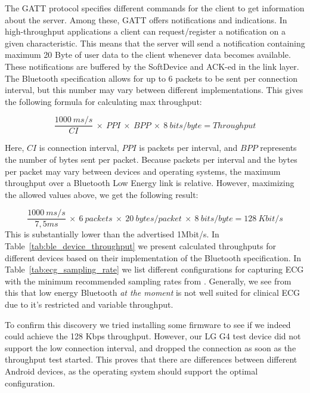 The GATT protocol specifies different commands for the client to get information about the server. Among these, GATT offers notifications and indications. In high-throughput applications a client can request/register a notification on a given characteristic. This means that the server will send a notification containing maximum 20 Byte of user data to the client whenever data becomes available. These notifications are buffered by the SoftDevice and ACK-ed in the link layer. The Bluetooth specification allows for up to 6 packets to be sent per connection interval, but this number may vary between different implementations. This gives the following formula for calculating max throughput:

\[
\frac{1000\: ms/s}{CI}\: \times\: PPI\: \times\: BPP\: \times\: 8\: bits/byte = Throughput
\]

\newline
\noindent
Here, $CI$ is connection interval, $PPI$ is packets per interval, and $BPP$ represents the number of bytes sent per packet. Because packets per interval and the bytes per packet may vary between devices and operating systems, the maximum throughput over a Bluetooth Low Energy link is relative. However, maximizing the allowed values above, we get the following result: 

\[
\frac{1000\: ms/s}{7,5ms}\: \times\: 6\: packets\: \times\: 20\:bytes/packet\: \times\: 8\: bits/byte = 128\:Kbit/s
\]
\newline
\noindent
This is substantially lower than the advertised 1Mbit/s. In Table~\ref{tab:ble_device_throughput}  we present calculated throughputs for different devices based on their implementation of the Bluetooth specification. In Table~\ref{tab:ecg_sampling_rate} we list different configurations for capturing ECG with the minimum recommended sampling rates from \cite{Anonymous:j4z9MACD}. Generally, we see from this that low energy Bluetooth \textit{at the moment} is not well suited for clinical ECG due to it's restricted and variable throughput.

To confirm this discovery we tried installing some firmware \cite{nordic:throughputtest} to see if we indeed could achieve the 128 Kbps throughput. However, our LG G4 test device did not support the low connection interval, and dropped the connection as soon as the throughput test started. This proves that there are differences between different Android devices, as the operating system should support the optimal configuration.


